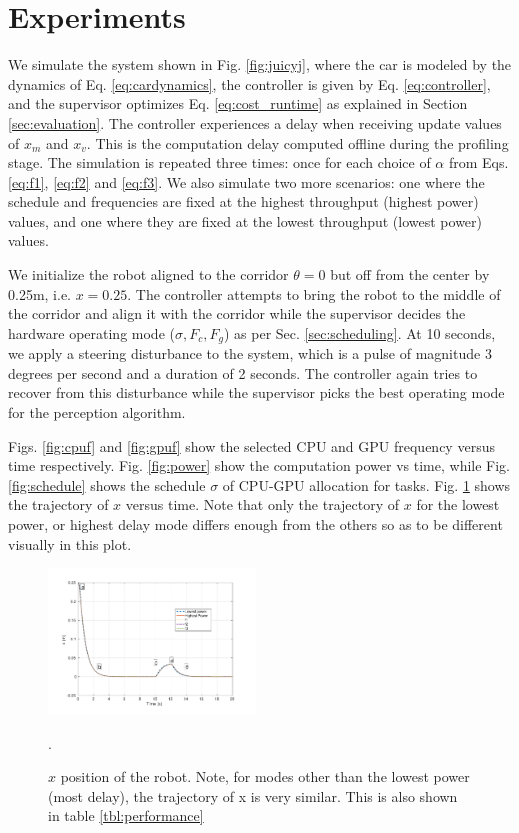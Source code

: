 \section{Experiments}
\label{sec:simResults}

We simulate the system shown in Fig. \ref{fig:juicyj}, where the car is modeled by the dynamics of Eq. \eqref{eq:cardynamics}, the controller is given by Eq. \eqref{eq:controller}, and the supervisor optimizes Eq. \ref{eq:cost_runtime} as explained in Section \ref{sec:evaluation}. 
The controller experiences a delay when receiving update values of $x_m$ and $x_v$. 
This is the computation delay computed offline during the profiling stage. 
The simulation is repeated three times: once for each choice of $\alpha$ from Eqs. \eqref{eq:f1}, \eqref{eq:f2} and \eqref{eq:f3}.
We also simulate two more scenarios: one where the schedule and frequencies are fixed at the highest throughput (highest power) values, and one where they are fixed at the lowest throughput (lowest power) values.

We initialize the robot aligned to the corridor $\theta=0$ but off from the center by 0.25m, i.e. $x=0.25$. 
The controller attempts to bring the robot to the middle of the corridor and align it with the corridor while the supervisor decides the hardware operating mode ($\sigma,F_c,F_g$) as per Sec. \ref{sec:scheduling}. 
At 10 seconds, we apply a steering disturbance to the system, which is a pulse of magnitude 3 degrees per second and a duration of 2 seconds. 
The controller again tries to recover from this disturbance while the supervisor picks the best operating mode for the perception algorithm. 

Figs. \ref{fig:cpuf} and \ref{fig:gpuf} show the selected CPU and GPU frequency versus time respectively. 
Fig. \ref{fig:power} show the computation power vs time, while Fig. \ref{fig:schedule} shows the schedule $\sigma$ of CPU-GPU allocation for tasks.
Fig. \ref{fig:xvst} shows the trajectory of $x$ versus time.  
Note that only the trajectory of $x$ for the lowest power, or highest delay mode differs enough from the others so as to be different visually in this plot.


\begin{figure}[t]
\centering
\includegraphics[width=0.49\textwidth]{../simulations/figs/xvst.pdf}
\caption{$x$ position of the robot. Note, for modes other than the lowest power (most delay), the trajectory of x is very similar. This is also shown in table \ref{tbl:performance}}.
\label{fig:xvst} 
\end{figure}

